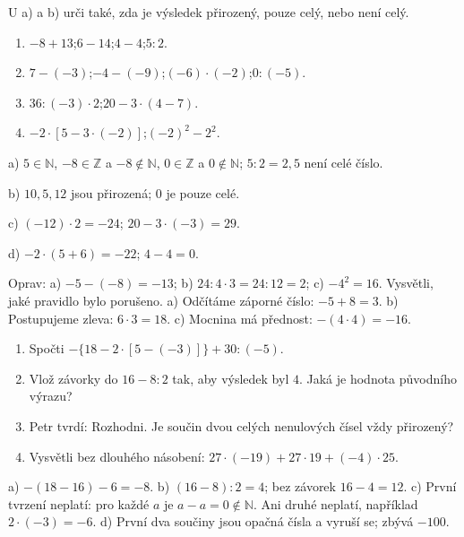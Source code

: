 \documentclass[11pt,a4paper]{article}
\begin{document}
\begin{zadaniReseniBox}[title={Samostatná práce 2},breakable=false]
U a) a b) urči také, zda je výsledek přirozený, pouze celý, nebo není celý.
\begin{enumerate}[label=\alph*)]
\item $-8+13$;\quad $6-14$;\quad $4-4$;\quad $5:2$.
\item $7-(-3)$;\quad $-4-(-9)$;\quad $(-6)\cdot(-2)$;\quad $0:(-5)$.
\item $36:(-3)\cdot2$;\quad $20-3\cdot(4-7)$.
\item $-2\cdot[5-3\cdot(-2)]$;\quad $(-2)^2-2^2$.
\end{enumerate}
\tcblower
a) $5\in\mathbb N$, $-8\in\mathbb Z$ a $-8\notin\mathbb N$,
$0\in\mathbb Z$ a $0\notin\mathbb N$; $5:2=2{,}5$ není celé číslo.

b) $10,5,12$ jsou přirozená; $0$ je pouze celé.

c) $(-12)\cdot2=-24$; $20-3\cdot(-3)=29$.

d) $-2\cdot(5+6)=-22$; $4-4=0$.
\end{zadaniReseniBox}

\begin{zadaniReseniBox}[title={Samostatná práce 3},breakable=false]
Oprav: a) $-5-(-8)=-13$; b) $24:4\cdot3=24:12=2$;
c) $-4^2=16$. Vysvětli, jaké pravidlo bylo porušeno.
\tcblower
a) Odčítáme záporné číslo: $-5+8=3$.
b) Postupujeme zleva: $6\cdot3=18$.
c) Mocnina má přednost: $-(4\cdot4)=-16$.
\end{zadaniReseniBox}


\begin{zadaniReseniBox}[title={Rozšíření 1},breakable=false]
\begin{enumerate}[label=\alph*)]
\item Spočti $-\{18-2\cdot[5-(-3)]\}+30:(-5)$.
\item Vlož závorky do $16-8:2$ tak, aby výsledek byl $4$.
Jaká je hodnota původního výrazu?
\item Petr tvrdí: 
Rozhodni. Je součin dvou celých nenulových čísel vždy přirozený?
\item Vysvětli bez dlouhého násobení:
$27\cdot(-19)+27\cdot19+(-4)\cdot25$.
\end{enumerate}
\tcblower
a) $-(18-16)-6=-8$.
b) $(16-8):2=4$; bez závorek $16-4=12$.
c) První tvrzení neplatí: pro každé $a$ je $a-a=0\notin\mathbb N$.
Ani druhé neplatí, například $2\cdot(-3)=-6$.
d) První dva součiny jsou opačná čísla a vyruší se; zbývá $-100$.
\end{zadaniReseniBox}
\end{document}
